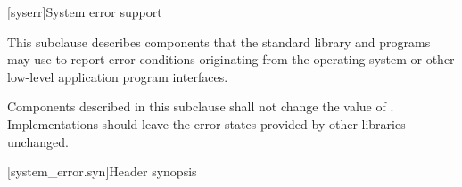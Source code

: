 
[syserr]{System error support}

\pnum
This subclause describes components that the standard library and
\Cpp{} programs may use to report error conditions originating from
the operating system or other low-level application program interfaces.

\pnum
Components described in this subclause shall not change the value of
.
Implementations should leave the error states provided by other
libraries unchanged.

[system_error.syn]{Header  synopsis}
%
%
%
%
%
%
%
%

